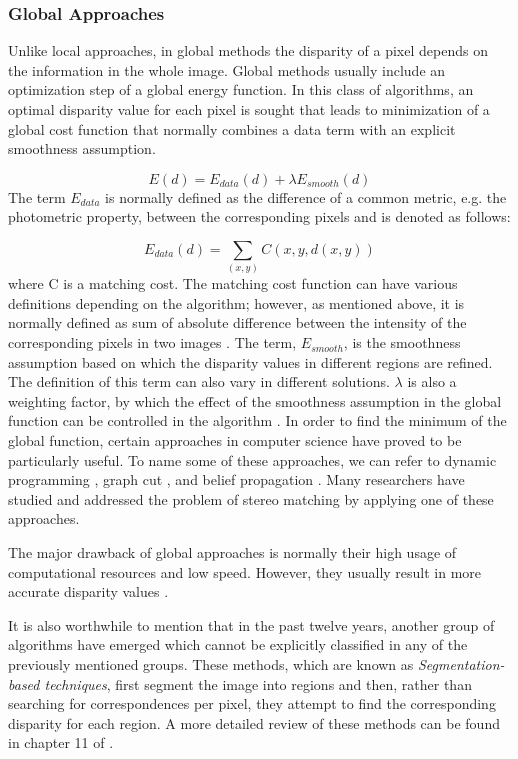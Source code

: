 \subsubsection{Global Approaches}
Unlike local approaches, in global methods the disparity of a pixel depends on the information in
the whole image. Global methods usually include an optimization step of a global energy
function\cite{roy98,bobi99,boyk01,hong10}. In this class of algorithms, an optimal disparity value for each pixel is sought that leads to minimization of a global cost
function that normally combines a data term with an explicit smoothness assumption.

\begin{equation}
E(d)=E_{data}(d)+\lambda E_{smooth}(d)
\end{equation}
The term $E_{data}$ is normally defined as the difference of a common metric, e.g. the photometric property, between the corresponding pixels and is denoted as follows:

\begin{equation}
E_{data}(d) = \sum_{(x,y)}C(x,y,d(x,y))
\end{equation}
\noindent
where C is a matching cost. The matching cost function can have various definitions depending on the algorithm; however, as mentioned above, it is normally defined as sum of absolute difference 
between the intensity of the corresponding pixels in two images \cite{sch02}. \newline
The term, $E_{smooth}$, is the smoothness assumption based on which the disparity values in different regions are refined. The definition of this term can also vary in 
different solutions. $\lambda$ is also a weighting factor, by which the effect of the smoothness assumption in the global function can be controlled in the algorithm \cite{sze11}.
In order to find the minimum of the global function, certain approaches in computer science have proved to be particularly useful. 
To name some of these approaches, we can refer to dynamic programming \cite{kim05}, graph cut \cite{boy01,boyk01,boy04}, and belief propagation \cite{sun11}. 
Many researchers have studied and addressed the problem of stereo matching
by applying one of these approaches.

The major drawback of global approaches is normally their high usage of computational resources and low speed. However, 
they usually result in more accurate disparity values \cite{hirsch02,sze11}. 

It is also worthwhile to mention that in the past twelve years, another group of algorithms have emerged which cannot be explicitly classified in any of the previously mentioned groups.
These methods, which are known as {\it Segmentation-based techniques}, first segment the image into regions and then, rather than searching for correspondences per pixel,
they attempt to find the corresponding disparity for each region. A more detailed review of these methods can be found in chapter 11 of \cite{sze11}.

